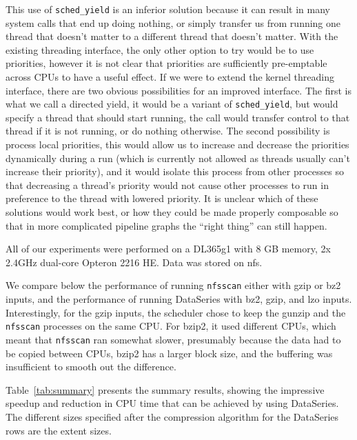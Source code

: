 \documentclass{article}
\begin{document}
This use of \texttt{sched\_yield} is an inferior solution because it
can result in many system calls that end up doing nothing, or simply
transfer us from running one thread that doesn't matter to a different
thread that doesn't matter.  With the existing threading interface,
the only other option to try would be to use priorities, however it is
not clear that priorities are sufficiently pre-emptable across CPUs to
have a useful effect.  If we were to extend the kernel threading
interface, there are two obvious possibilities for an improved
interface.  The first is what we call a directed yield, it would be a
variant of \texttt{sched\_yield}, but would specify a thread that should start
running, the call would transfer control to that thread if it is not
running, or do nothing otherwise.  The second possibility is process
local priorities, this would allow us to increase and decrease the
priorities dynamically during a run (which is currently not allowed as
threads usually can't increase their priority), and it would isolate
this process from other processes so that decreasing a thread's
priority would not cause other processes to run in preference to the
thread with lowered priority.  It is unclear which of these solutions
would work best, or how they could be made properly composable so that
in more complicated pipeline graphs the ``right thing'' can still
happen.

All of our experiments were performed on a DL365g1 with 8 GB memory, 2x
2.4GHz dual-core Opteron 2216 HE.  Data was stored on nfs.

We compare below the performance of running \texttt{nfsscan} either
with gzip or bz2 inputs, and the performance of running DataSeries
with bz2, gzip, and lzo inputs.  Interestingly, for the gzip inputs,
the scheduler chose to keep the gunzip and the \texttt{nfsscan}
processes on the same CPU.  For bzip2, it used different CPUs, which
meant that \texttt{nfsscan} ran somewhat slower, presumably because the
data had to be copied between CPUs, bzip2 has a larger block size, and
the buffering was insufficient to smooth out the difference.

Table~\ref{tab:summary} presents the summary results, showing the
impressive speedup and reduction in CPU time that can be achieved by
using DataSeries.  The different sizes specified after the compression
algorithm for the DataSeries rows are the extent sizes.
\end{document}
